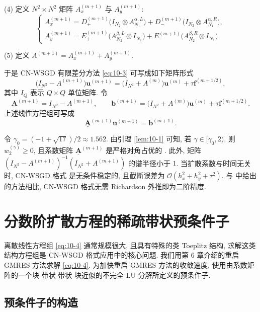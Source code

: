 (4) 定义 $N^{2}\times N^{2}$ 矩阵 $A_{x}^{(m+1)}$ 与 $A_{y}^{(m+1)}$:
\[
\left\{
\begin{array}{l}
A_{x}^{(m+1)}=D_{+}^{(m+1)}\bigl(I_{N_{2}}\otimes A_{N_{1}}^{\alpha,L}\bigr)+D_{-}^{(m+1)}\bigl(I_{N_{2}}\otimes A_{N_{1}}^{\alpha,R}\bigr),\\[2mm]
A_{y}^{(m+1)}=E_{+}^{(m+1)}\bigl(A_{N_{2}}^{\beta,L}\otimes I_{N_{1}}\bigr)+E_{-}^{(m+1)}\bigl(A_{N_{2}}^{\beta,R}\otimes I_{N_{1}}\bigr).
\end{array}
\right.
\]

(5) 定义 $A^{(m+1)}=A_{x}^{(m+1)}+A_{y}^{(m+1)}$.

于是 CN-WSGD 有限差分方法 \eqref{eq:10-3} 可写成如下矩阵形式
\[
  \bigl(I_{N^{2}}-A^{(m+1)}\bigr)\mathbf{u}^{(m+1)}
  =\bigl(I_{N^{2}}+A^{(m)}\bigr)\mathbf{u}^{(m)}+\tau\mathbf{f}^{(m+1/2)},
\]
其中 $I_{Q}$ 表示 $Q\times Q$ 单位矩阵. 令
\[
  \underline{\mathbf{A}}^{(m+1)}=I_{N^{2}}-A^{(m+1)},\qquad
  \mathbf{b}^{(m+1)}=\bigl(I_{N^{2}}+A^{(m)}\bigr)\mathbf{u}^{(m)}+\tau\mathbf{f}^{(m+1/2)}.
\]
上述线性方程组可写成
\begin{equation}
  \underline{\mathbf{A}}^{(m+1)}\mathbf{u}^{(m+1)}=\mathbf{b}^{(m+1)}.
\label{eq:10-4}
\end{equation}

令 $\gamma_{0}=(-1+\sqrt{17})/2\approx 1.562$. 由引理 \ref{lem:10-1} 可知, 若 $\gamma\in[\gamma_{0},2)$, 则 $w_{2}^{(\gamma)}\geqslant 0$, 且系数矩阵 $\underline{\mathbf{A}}^{(m+1)}$ 是严格对角占优的 . 此外, 矩阵 $(I_{N^{2}}-A^{(m+1)})^{-1}(I_{N^{2}}+A^{(m+1)})$ 的谱半径小于 $1$. 当扩散系数与时间无关时, CN-WSGD 格式 \cite{src:79} 是无条件稳定的, 且截断误差为 $\mathcal{O}(h_{x}^{2}+h_{y}^{2}+\tau^{2})$. 与 \cite{src:78} 中给出的方法相比, CN-WSGD 格式无需 Richardson 外推即为二阶精度.

\section{分数阶扩散方程的稀疏带状预条件子}
\label{sec:10-3}

离散线性方程组 \eqref{eq:10-4} 通常规模很大, 且具有特殊的类 Toeplitz 结构, 求解这类结构方程组是 CN-WSGD 格式应用中的核心问题. 我们用第 6 章介绍的重启 GMRES 方法求解 \eqref{eq:10-4}. 为加快重启 GMRES 方法的收敛速度, 使用由系数矩阵的一个块-带状-带状-块近似的不完全 LU 分解所定义的预条件子.

\subsection{预条件子的构造}
\label{sec:10-3-1}

